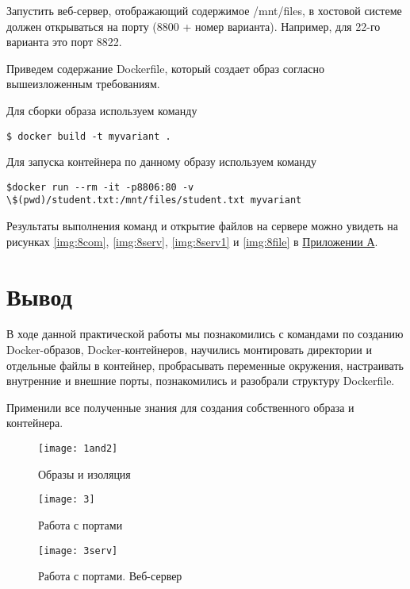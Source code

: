 \documentclass[a4paper,14pt]{extarticle}
\begin{document}
Запустить веб-сервер, отображающий содержимое /mnt/files, в хостовой системе должен открываться на порту (8800 + номер варианта). Например, для 22-го варианта это порт 8822.

Приведем содержание Dockerfile, который создает образ согласно вышеизложенным требованиям. 



Для сборки образа используем команду

\begin{lstlisting}
$ docker build -t myvariant .
\end{lstlisting}

Для запуска контейнера по данному образу используем команду 

\begin{lstlisting}
$docker run --rm -it -p8806:80 -v \$(pwd)/student.txt:/mnt/files/student.txt myvariant
\end{lstlisting}

Результаты выполнения команд и открытие файлов на сервере можно увидеть на рисунках \ref{img:8com}, \ref{img:8serv}, \ref{img:8serv1} и \ref{img:8file} в \hyperref[A]{Приложении А}.

\section{Вывод}
В ходе данной практической работы мы познакомились с командами по созданию Docker-образов, Docker-контейнеров, научились монтировать директории и отдельные файлы в контейнер, пробрасывать переменные окружения, настраивать внутренние и внешние порты, познакомились и разобрали структуру Dockerfile.

Применили все полученные знания для создания собственного образа и контейнера.
\newpage
{\centering
{}
}
\label{A}
\begin{figure}[hptb]
	\centering
	\texttt{[image: 1and2]}
	\caption{Образы и изоляция}
	\label{img:1and2}
\end{figure}

\begin{figure}[hptb]
	\centering
	\texttt{[image: 3]}
	\caption{Работа с портами}
	\label{img:3and4}
\end{figure}

\begin{figure}[hptb]
	\centering
	\texttt{[image: 3serv]}
	\caption{Работа с портами. Веб-сервер}
	\label{img:3serv}
\end{figure}
\end{document}
